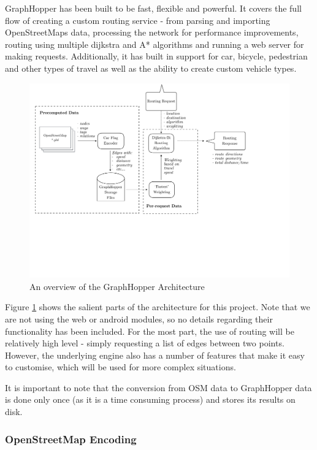 \documentclass[ %
                    author={Alexander Hill},
                supervisor={Dr. Benjamin Sach},
                    degree={MEng},
                     title={MARMOSET},
                  subtitle={Multi-Agent Route Management using Online Simulation for Efficient Transportation},
                      type={research},
                      year={2016} ]{dissertation}
\begin{document}
GraphHopper has been built to be fast, flexible and powerful. It covers the full
flow of creating a custom routing service - from parsing and importing
OpenStreetMaps data, processing the network for performance improvements,
routing using multiple dijkstra and A* algorithms and running a web server for
making requests. Additionally, it has built in support for car, bicycle,
pedestrian and other types of travel as well as the ability to create custom
vehicle types.

\begin{figure}[p]
    \centering
    \includegraphics[scale=0.5,page=1,clip,trim=0 8cm 4cm 0]{architecture}
    \caption{An overview of the GraphHopper Architecture}\label{fig:gh-arch}
\end{figure}

Figure \ref{fig:gh-arch} shows the salient parts of the architecture for this
project.  Note that we are not using the web or android modules, so no details
regarding their functionality has been included. For the most part, the use of
routing will be relatively high level - simply requesting a list of edges
between two points. However, the underlying engine also has a number of features
that make it easy to customise, which will be used for more complex situations.

It is important to note that the conversion from OSM data to GraphHopper data is
done only once (as it is a time consuming process) and stores its results on
disk.

\subsubsection{OpenStreetMap Encoding}
\end{document}
